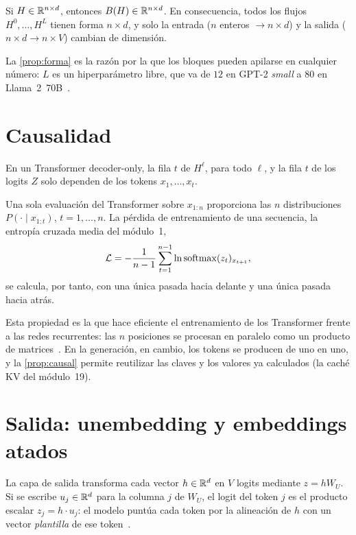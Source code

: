 \begin{proposicion}\label{prop:forma}
Si $H\in\mathbb{R}^{n\times d}$, entonces $B(H)\in\mathbb{R}^{n\times d}$. En consecuencia, todos los flujos $H^{0},\dots,H^{L}$ tienen forma $n\times d$, y solo la entrada ($n$ enteros $\to n\times d$) y la salida ($n\times d\to n\times V$) cambian de dimensión.
\end{proposicion}

La \cref{prop:forma} es la razón por la que los bloques pueden apilarse en cualquier número: $L$ es un hiperparámetro libre, que va de $12$ en GPT-2 \emph{small} a $80$ en Llama~2~70B~\cite{gpt2,llama2}.

\section{Causalidad}

\begin{proposicion}\label{prop:causal}
En un Transformer decoder-only, la fila $t$ de $H^{\ell}$, para todo $\ell$, y la fila $t$ de los logits $Z$ solo dependen de los tokens $x_1,\dots,x_t$.
\end{proposicion}

\begin{corolario}\label{cor:paralelo}
Una sola evaluación del Transformer sobre $x_{1:n}$ proporciona las $n$ distribuciones $P(\cdot\mid x_{1:t})$, $t=1,\dots,n$. La pérdida de entrenamiento de una secuencia, la entropía cruzada media del módulo~1,
\[
\mathcal{L}=-\frac{1}{n-1}\sum_{t=1}^{n-1}\ln\operatorname{softmax}(z_t)_{x_{t+1}},
\]
se calcula, por tanto, con una única pasada hacia delante y una única pasada hacia atrás.
\end{corolario}

Esta propiedad es la que hace eficiente el entrenamiento de los Transformer frente a las redes recurrentes: las $n$ posiciones se procesan en paralelo como un producto de matrices~\cite[§7.3]{jm3}. En la generación, en cambio, los tokens se producen de uno en uno, y la \cref{prop:causal} permite reutilizar las claves y los valores ya calculados (la caché KV del módulo~19).

\section{Salida: unembedding y embeddings atados}

La capa de salida transforma cada vector $h\in\mathbb{R}^{d}$ en $V$ logits mediante $z=hW_U$. Si se escribe $u_j\in\mathbb{R}^{d}$ para la columna $j$ de $W_U$, el logit del token $j$ es el producto escalar $z_j=h\cdot u_j$: el modelo puntúa cada token por la alineación de $h$ con un vector \emph{plantilla} de ese token~\cite[§7.5]{jm3}.

